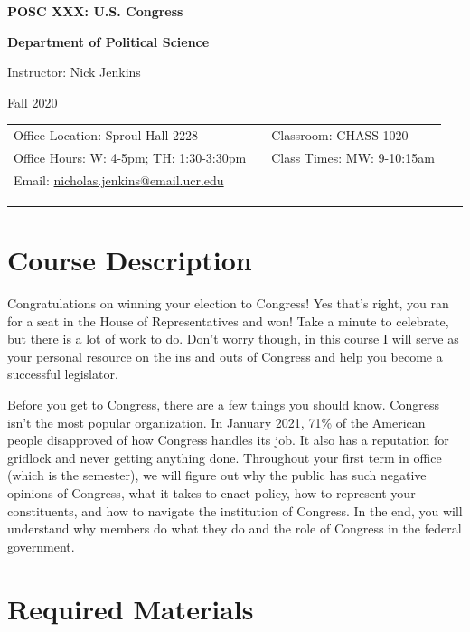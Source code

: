 \documentclass[11pt]{article}
\title{\coursename}
\author{\semester}
\date{\semester}
\makeatletter
\newcommand{\coursenum}{POSC XXX}
\newcommand{\coursename}{U.S. Congress}
\newcommand{\department}{Political Science}
\newcommand{\semester}{Fall 2020}
\newcommand{\roomnumb}{CHASS 1020}
\newcommand{\classtimes}{MW: 9-10:15am}
\newcommand{\myname}{Nick Jenkins}
\newcommand{\myemail}{nicholas.jenkins@email.ucr.edu}
\newcommand{\office}{Sproul Hall 2228}
\newcommand{\officehours}{W: 4-5pm; TH: 1:30-3:30pm}
\makeatother
\begin{document}
\begin{center}
\LARGE \textbf{{\coursenum}: {\coursename}}

\LARGE \textbf{Department of \department}

\Large Instructor: \myname

\Large \semester
\end{center}

\begin{center}
\begin{tabular}{l c l}
Office Location: \office & & Classroom: \roomnumb \\
Office Hours: \officehours & & Class Times: \classtimes \\
Email: \href{mailto:\myemail}{\myemail} & & \\
\end{tabular}
\end{center}

\noindent\rule{16.5cm}{0.4pt}


\section*{Course Description}

Congratulations on winning your election to Congress! Yes that's right, you ran for a seat in the House of Representatives and won! Take a minute to celebrate, but there is a lot of work to do. Don't worry though, in this course I will serve as your personal resource on the ins and outs of Congress and help you become a successful legislator. 

Before you get to Congress, there are a few things you should know. Congress isn't the most popular organization. In \href{https://news.gallup.com/poll/1600/congress-public.aspx}{January 2021, 71\%} of the American people disapproved of how Congress handles its job. It also has a reputation for gridlock and never getting anything done. Throughout your first term in office (which is the semester), we will figure out why the public has such negative opinions of Congress, what it takes to enact policy, how to represent your constituents, and how to navigate the institution of Congress. In the end, you will understand why members do what they do and the role of Congress in the federal government.

\section*{Required Materials}
\end{document}
